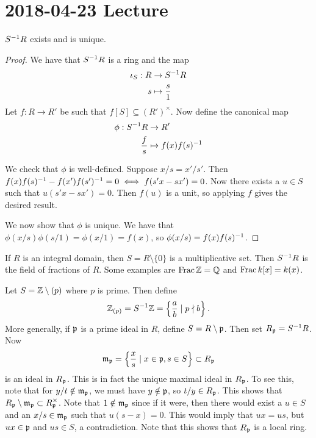 \section{2018-04-23 Lecture}

\begin{prop}[2.2]
	$S^{-1} R$ exists and is unique.
\end{prop}

\begin{proof}
	We have that $S^{-1} R$ is a ring and the map
	\begin{align*}
	  \iota_S: R &\to S^{-1} R \\
	  s &\mapsto \frac{s}{1}
	\end{align*}
	Let $f: R \to R'$ be such that $f[S] \subseteq (R')^\times$.
	Now define the canonical map
	\begin{align*}
	  \phi: S^{-1} R &\to R' \\
	  \frac{f}{s} &\mapsto f(x)f(s)^{-1}
	\end{align*}

	We check that $\phi$ is well-defined.
	Suppose $x/s = x'/s'$.
	Then $f(x)f(s)^{-1}-f(x')f(s')^{-1}=0 \iff f(s'x-sx')=0$.
	Now there exists a $u \in S$ such that $u(s'x-sx')=0$.
	Then $f(u)$ is a unit, so applying $f$ gives the desired result.

	We now show that $\phi$ is unique.
	We have that $\phi(x/s)\phi(s/1) = \phi(x/1)=f(x)$, so $\phi(x/s)=f(x)f(s)^{-1}$.
\end{proof}

\begin{exam}
  \leavevmode
  \begin{enum}
    \io
    If $R$ is an integral domain, then $S = R \setminus \{0\}$ is a multiplicative set.
    Then $S^{-1} R$ is the field of fractions of $R$.
    Some examples are $\operatorname{Frac}\mathbb{Z}=\mathbb{Q}$ and $\operatorname{Frac} k[x]=k(x)$.

    \io
    Let $S=\mathbb{Z}\setminus(p)$ where $p$ is prime.
    Then define
    \[\mathbb{Z}_{(p)}=S^{-1}\mathbb{Z} = \left\{ \frac{a}{b} \mid p \nmid b \right\}.\]
    More generally, if $\mathfrak{p}$ is a prime ideal in $R$, define $S = R \setminus \mathfrak{p}$.
    Then set $R_{\mathfrak{p}} = S^{-1} R$.
    Now
    \[\mathfrak{m}_{\mathfrak{p}} = \left\{ \frac{x}{s} \mid x \in \mathfrak{p}, s \in S \right\} \subset R_{\mathfrak{p}}\]
    is an ideal in $R_{\mathfrak{p}}$.
    This is in fact the unique maximal ideal in $R_{\mathfrak{p}}$.
    To see this, note that for $y/t \notin \mathfrak{m}_{\mathfrak{p}}$, we must have $y \notin \mathfrak{p}$, so $t/y \in R_{\mathfrak{p}}$.
    This shows that $R_{\mathfrak{p}} \setminus \mathfrak{m}_{\mathfrak{p}} \subset R_{\mathfrak{p}}^\times$.
    Note that $1 \notin \mathfrak{m}_{\mathfrak{p}}$ since if it were, then there would exist a $u \in S$ and an $x/s \in \mathfrak{m}_{\mathfrak{p}}$ such that $u(s-x)=0$.
    This would imply that $ux=us$, but $ux \in \mathfrak{p}$ and $us \in S$, a contradiction.
    Note that this shows that $R_{\mathfrak{p}}$ is a local ring.
  \end{enum}
\end{exam}

